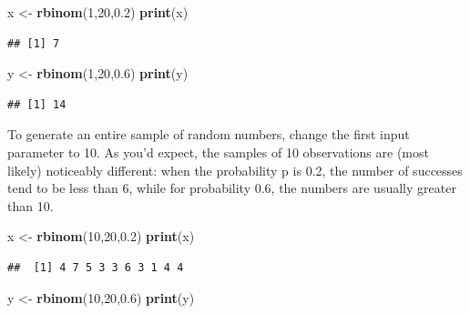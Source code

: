\documentclass[
]{book}
\newenvironment{Shaded}{\begin{snugshade}}{\end{snugshade}}
\newcommand{\DecValTok}[1]{\textcolor[rgb]{0.00,0.00,0.81}{#1}}
\newcommand{\FloatTok}[1]{\textcolor[rgb]{0.00,0.00,0.81}{#1}}
\newcommand{\KeywordTok}[1]{\textcolor[rgb]{0.13,0.29,0.53}{\textbf{#1}}}
\newcommand{\NormalTok}[1]{#1}
\newcommand{\StringTok}[1]{\textcolor[rgb]{0.31,0.60,0.02}{#1}}
\theoremstyle{definition}
\theoremstyle{definition}
\theoremstyle{definition}
\theoremstyle{remark}
\begin{document}
\begin{Shaded}
\begin{Highlighting}[]
\NormalTok{x \textless{}{-}}\StringTok{ }\KeywordTok{rbinom}\NormalTok{(}\DecValTok{1}\NormalTok{,}\DecValTok{20}\NormalTok{,}\FloatTok{0.2}\NormalTok{)}
\KeywordTok{print}\NormalTok{(x)}
\end{Highlighting}
\end{Shaded}

\begin{verbatim}
## [1] 7
\end{verbatim}

\begin{Shaded}
\begin{Highlighting}[]
\NormalTok{y \textless{}{-}}\StringTok{ }\KeywordTok{rbinom}\NormalTok{(}\DecValTok{1}\NormalTok{,}\DecValTok{20}\NormalTok{,}\FloatTok{0.6}\NormalTok{)}
\KeywordTok{print}\NormalTok{(y)}
\end{Highlighting}
\end{Shaded}

\begin{verbatim}
## [1] 14
\end{verbatim}

To generate an entire sample of random numbers, change the first input parameter to 10. As you'd expect, the samples of 10 observations are (most likely) noticeably different: when the probability p is 0.2, the number of successes tend to be less than 6, while for probability 0.6, the numbers are usually greater than 10.

\begin{Shaded}
\begin{Highlighting}[]
\NormalTok{x \textless{}{-}}\StringTok{ }\KeywordTok{rbinom}\NormalTok{(}\DecValTok{10}\NormalTok{,}\DecValTok{20}\NormalTok{,}\FloatTok{0.2}\NormalTok{)}
\KeywordTok{print}\NormalTok{(x)}
\end{Highlighting}
\end{Shaded}

\begin{verbatim}
##  [1] 4 7 5 3 3 6 3 1 4 4
\end{verbatim}

\begin{Shaded}
\begin{Highlighting}[]
\NormalTok{y \textless{}{-}}\StringTok{ }\KeywordTok{rbinom}\NormalTok{(}\DecValTok{10}\NormalTok{,}\DecValTok{20}\NormalTok{,}\FloatTok{0.6}\NormalTok{)}
\KeywordTok{print}\NormalTok{(y)}
\end{Highlighting}
\end{Shaded}
\end{document}
